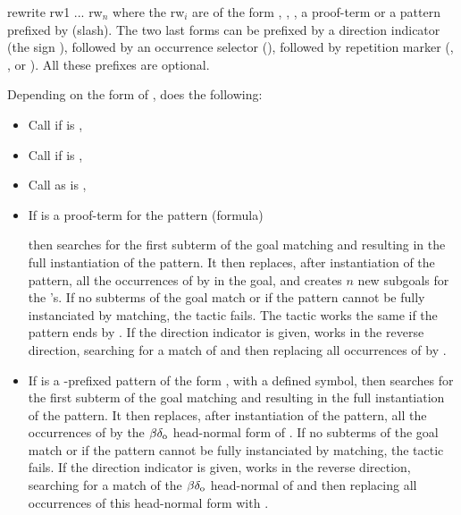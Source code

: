\addAuto
{rewrite}
{rw1 ... rw${}_n$ where the rw${}_i$ are of the form \ec{//},
\ec{/=}, \ec{//=}, a proof-term or a pattern prefixed by \ec{/}
(slash). The two last forms can be prefixed by a direction indicator (the sign
\ec{-}), followed by an occurrence selector (),
followed by repetition marker (\ec{!}, ,  or ). All
these prefixes are optional.}
{Depending on the form of , \tacname{}  does the following:
  \begin{itemize}
   \item Call  if  is \ec{//},
   \item Call  if  is \ec{/=},
   \item Call  as  is \ec{//=},
   \item If  is a proof-term for the pattern (formula)
     \begin{center}
     \end{center}
     \noindent then \tacname{} searches for the first subterm of the goal
     matching  and resulting in the full instantiation of the pattern.
     It then replaces, after instantiation of the pattern, all the occurrences
     of  by  in the goal, and creates $n$ new subgoals for the
     's. If no subterms of the goal match  or if the pattern
     cannot be fully instanciated by matching, the tactic fails.
     The tactic works the same if the pattern ends by . If the
     direction indicator \ec{-} is given, \tacname{} works in the reverse
     direction, searching for a match of  and then replacing all
     occurrences of  by .
   \item If  is a \ec{/}-prefixed pattern of the form ,
     with  a defined symbol, then \tacname{} searches for the first subterm
     of the goal matching  and resulting in the full instantiation
     of the pattern. It then replaces, after instantiation of the pattern, all
     the occurrences of  by the $\beta\delta_{\rm o}$ head-normal form
     of . If no subterms of the goal match  or
     if the pattern cannot be fully instanciated by matching, the tactic fails. If the
     direction indicator \ec{-} is given, \tacname{} works in the reverse
     direction, searching for a match of the $\beta\delta_{\rm o}$ head-normal
     of  and then replacing all occurrences of this head-normal
     form with .
  \end{itemize}
  
}
